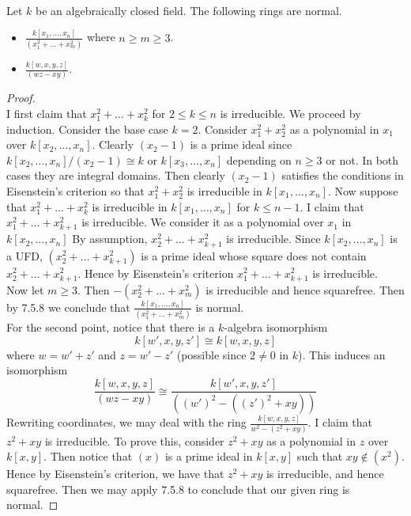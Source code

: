 \documentclass[a4paper]{article}
\begin{document}
\begin{eg}{}{}\\
Let $k$ be an algebraically closed field. The following rings are normal. 
\begin{itemize}
\item $\frac{k[x_1,\dots,x_n]}{(x_1^2+\dots+x_m^2)}$ where $n\geq m\geq 3$. 
\item $\frac{k[w,x,y,z]}{(wz-xy)}$. 
\end{itemize}
\begin{proof}\\
I first claim that $x_1^2+\dots+x_k^2$ for $2\leq k\leq n$ is irreducible. We proceed by induction. Consider the base case $k=2$. Consider $x_1^2+x_2^2$ as a polynomial in $x_1$ over $k[x_2,\dots,x_n]$. Clearly $(x_2-1)$ is a prime ideal since $k[x_2,\dots,x_n]/(x_2-1)\cong k$ or $k[x_3,\dots,x_n]$ depending on $n\geq 3$ or not. In both cases they are integral domains. Then clearly $(x_2-1)$ satisfies the conditions in Eisenstein's criterion so that $x_1^2+x_2^2$ is irreducible in $k[x_1,\dots,x_n]$. Now suppose that $x_1^2+\dots+x_k^2$ is irreducible in $k[x_1,\dots,x_n]$ for $k\leq n-1$. I claim that $x_1^2+\dots+x_{k+1}^2$ is irreducible. We consider it as a polynomial over $x_1$ in $k[x_2,\dots,x_n]$ By assumption, $x_2^2+\dots+x_{k+1}^2$ is irreducible. Since $k[x_2,\dots,x_n]$ is a UFD, $(x_2^2+\dots+x_{k+1}^2)$ is a prime ideal whose square does not contain $x_2^2+\dots+x_{k+1}^2$. Hence by Eisenstein's criterion $x_1^2+\dots+x_{k+1}^2$ is irreducible. \\

Now let $m\geq 3$. Then $-(x_2^2+\dots+x_m^2)$ is irreducible and hence squarefree. Then by 7.5.8 we conclude that $\frac{k[x_1,\dots,x_n]}{(x_1^2+\dots+x_m^2)}$ is normal. \\

For the second point, notice that there is a $k$-algebra isomorphism $$k[w',x,y,z']\cong k[w,x,y,z]$$ where $w=w'+z'$ and $z=w'-z'$ (possible since $2\neq 0$ in $k$). This induces an isomorphism $$\frac{k[w,x,y,z]}{(wz-xy)}\cong\frac{k[w',x,y,z']}{((w')^2-((z')^2+xy))}$$ Rewriting coordinates, we may deal with the ring $\frac{k[w,x,y,z]}{w^2-(z^2+xy)}$. I claim that $z^2+xy$ is irreducible. To prove this, consider $z^2+xy$ as a polynomial in $z$ over $k[x,y]$. Then notice that $(x)$ is a prime ideal in $k[x,y]$ such that $xy\notin(x^2)$. Hence by Eisenstein's criterion, we have that $z^2+xy$ is irreducible, and hence squarefree. Then we may apply 7.5.8 to conclude that our given ring is normal. 
\end{proof}
\end{eg}
\end{document}
